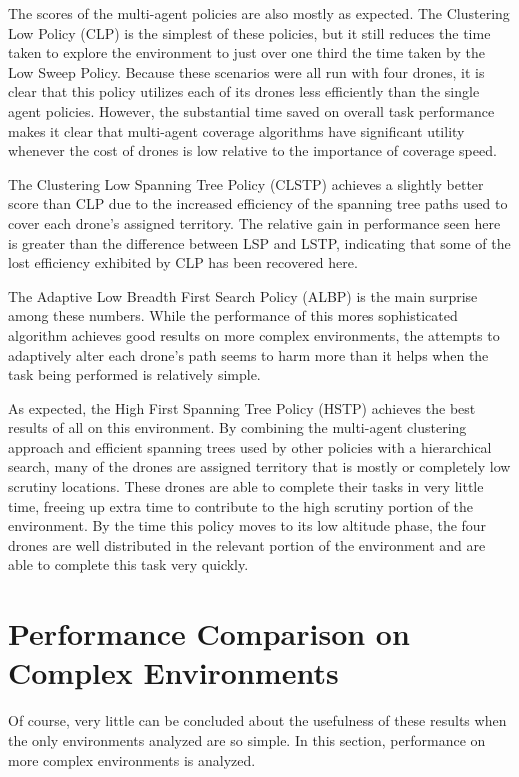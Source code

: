 The scores of the multi-agent policies are also mostly as expected. The Clustering Low Policy (CLP) is the simplest of these policies, but it still reduces the time taken to explore the environment to just over one third the time taken by the Low Sweep Policy. Because these scenarios were all run with four drones, it is clear that this policy utilizes each of its drones less efficiently than the single agent policies. However, the substantial time saved on overall task performance makes it clear that multi-agent coverage algorithms have significant utility whenever the cost of drones is low relative to the importance of coverage speed.

The Clustering Low Spanning Tree Policy (CLSTP) achieves a slightly better score than CLP due to the increased efficiency of the spanning tree paths used to cover each drone's assigned territory. The relative gain in performance seen here is greater than the difference between LSP and LSTP, indicating that some of the lost efficiency exhibited by CLP has been recovered here. 

The Adaptive Low Breadth First Search Policy (ALBP) is the main surprise among these numbers. While the performance of this mores sophisticated algorithm achieves good results on more complex environments, the attempts to adaptively alter each drone's path seems to harm more than it helps when the task being performed is relatively simple.

As expected, the High First Spanning Tree Policy (HSTP) achieves the best results of all on this environment. By combining the multi-agent clustering approach and efficient spanning trees used by other policies with a hierarchical search, many of the drones are assigned territory that is mostly or completely low scrutiny locations. These drones are able to complete their tasks in very little time, freeing up extra time to contribute to the high scrutiny portion of the environment. By the time this policy moves to its low altitude phase, the four drones are well distributed in the relevant portion of the environment and are able to complete this task very quickly.

\section{Performance Comparison on Complex Environments}

Of course, very little can be concluded about the usefulness of these results when the only environments analyzed are so simple. In this section, performance on more complex environments is analyzed.

